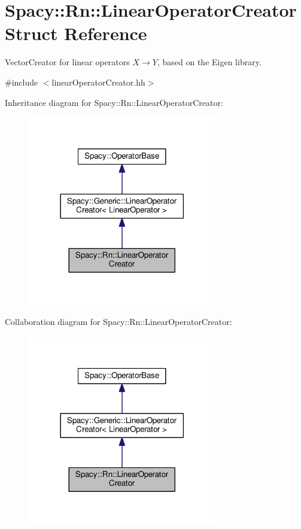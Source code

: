 \hypertarget{structSpacy_1_1Rn_1_1LinearOperatorCreator}{\section{Spacy\-:\-:Rn\-:\-:Linear\-Operator\-Creator Struct Reference}
\label{structSpacy_1_1Rn_1_1LinearOperatorCreator}
}


Vector\-Creator for linear operators $X\rightarrow Y$, based on the Eigen library.  




{\ttfamily \#include $<$linear\-Operator\-Creator.\-hh$>$}



Inheritance diagram for Spacy\-:\-:Rn\-:\-:Linear\-Operator\-Creator\-:
\nopagebreak
\begin{figure}[H]
\begin{center}
\leavevmode
\includegraphics[width=234pt]{structSpacy_1_1Rn_1_1LinearOperatorCreator__inherit__graph}
\end{center}
\end{figure}


Collaboration diagram for Spacy\-:\-:Rn\-:\-:Linear\-Operator\-Creator\-:
\nopagebreak
\begin{figure}[H]
\begin{center}
\leavevmode
\includegraphics[width=234pt]{structSpacy_1_1Rn_1_1LinearOperatorCreator__coll__graph}
\end{center}
\end{figure}
